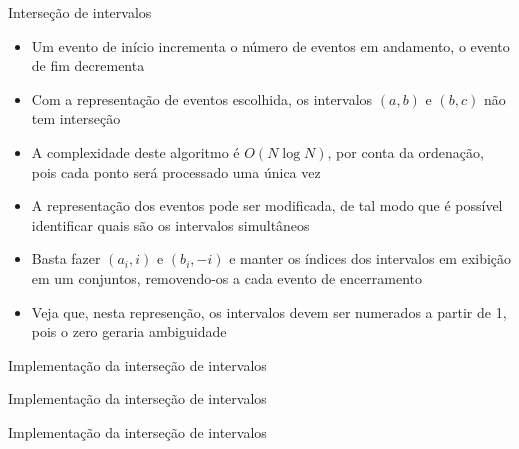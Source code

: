 \begin{frame}[fragile]{Interseção de intervalos}

    \begin{itemize}
        \item Um evento de início incrementa o número de eventos em andamento, o evento de fim
            decrementa

        \item Com a representação de eventos escolhida, os intervalos $(a, b)$ e $(b, c)$ não tem
            interseção

        \item A complexidade deste algoritmo é $O(N\log N)$, por conta da ordenação, pois
            cada ponto será processado uma única vez

        \item A representação dos eventos pode ser modificada, de tal modo que é possível 
            identificar quais são os intervalos simultâneos

        \item Basta fazer $(a_i, i)$ e $(b_i, -i)$ e manter os índices dos intervalos em
            exibição em um conjuntos, removendo-os a cada evento de encerramento

        \item Veja que, nesta represenção, os intervalos devem ser numerados a partir de 1,
            pois o zero geraria ambiguidade
    \end{itemize}

\end{frame}



\begin{frame}[fragile]{Implementação da interseção de intervalos}
\end{frame}

\begin{frame}[fragile]{Implementação da interseção de intervalos}
\end{frame}

\begin{frame}[fragile]{Implementação da interseção de intervalos}
\end{frame}

